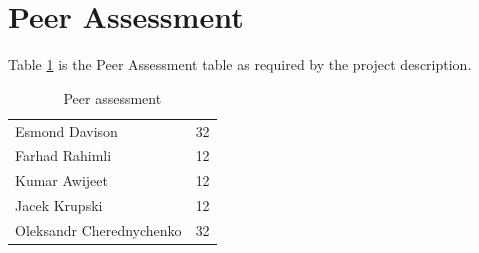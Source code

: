 \section{Peer Assessment}
Table \ref{table:peerAssesment} is the Peer Assessment table as required by the project description.

\begin{table}[hb]
\centering
\caption{Peer assessment}
\label{table:peerAssesment}
\begin{tabular}{lc}
\hline
Esmond Davison & 32\\
Farhad Rahimli & 12\\
Kumar Awijeet &  12\\
Jacek Krupski &  12\\
Oleksandr Cherednychenko &  32\\
\hline
\end{tabular}
\end{table}

\setlength{\parskip}{0em}
